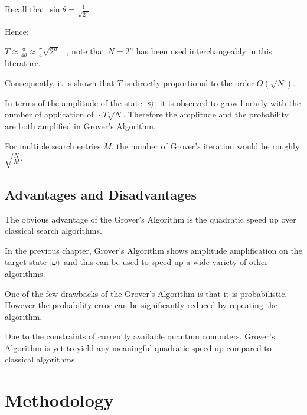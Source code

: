 \documentclass{article}
\begin{document}
\noindent
Recall that $\sin\theta = \frac{1}{\sqrt{2^n}}$
\vspace{5mm}

\noindent
Hence:
\vspace{5mm}

\noindent
\qquad $T \approx \frac{\pi}{4\theta} \approx \frac{\pi}{4}\sqrt{2^n}$ \ , note that $N = 2^n$ has been used interchangeably in this literature.
\vspace{5mm}

\noindent
Consequently, it is shown that $T$ is directly proportional to the order $O(\sqrt{N})$.
\pagebreak

\noindent
In terms of the amplitude of the state $\ket{s}$, it is observed to grow linearly with the number of application of $\sim T\sqrt{N}$. Therefore the amplitude and the probability are both amplified in Grover's Algorithm.
\vspace{5mm}

\noindent
For multiple search entries $M$, the number of Grover's iteration would be roughly $\sqrt{\frac{N}{M}}$.
\vspace{10mm}

\subsection{Advantages and Disadvantages}
\vspace{5mm}

\noindent
The obvious advantage of the Grover's Algorithm is the quadratic speed up over classical search algorithms. 
\vspace{5mm}

\noindent
In the previous chapter, Grover's Algorithm shows amplitude amplification on the target state $\ket{\omega}$ and this can be used to speed up a wide variety of other algorithms\cite{noauthor_grovers_nodate}. 
\vspace{5mm}

\noindent
One of the few drawbacks of the Grover's Algorithm is that it is probabilistic. However the probability error can be significantly reduced by repeating the algorithm.
\vspace{5mm}

\noindent
Due to the constraints of currently available quantum computers, Grover's Algorithm is yet to yield any  meaningful quadratic speed up compared to classical algorithms\cite{noauthor_grovers_2022}.   
\pagebreak

\section{Methodology}
\end{document}
